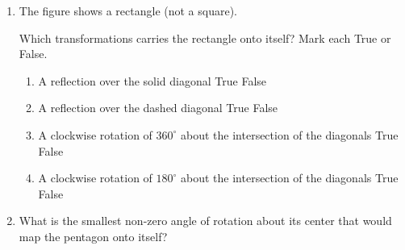\documentclass[12pt, twoside]{article}
\begin{document}
\begin{enumerate}
 \item The figure shows a rectangle (not a square).
  \begin{center}
  \end{center}
  Which transformations carries the rectangle onto itself? Mark each True or False.
    \begin{enumerate}
      \item A reflection over the solid diagonal \hfill True \quad False
      \item A reflection over the dashed diagonal \hfill True \quad False
      \item A clockwise rotation of $360^\circ$ about the intersection of the diagonals \hfill True \quad False
      \item A clockwise rotation of $180^\circ$ about the intersection of the diagonals \hfill True \quad False
    \end{enumerate}
    \vspace{1cm}

  \item What is the smallest non-zero angle of rotation about its center that would map the pentagon onto itself? \vspace{0.25cm} %
  \begin{center}
   \end{center}

\end{enumerate}
\end{document}
